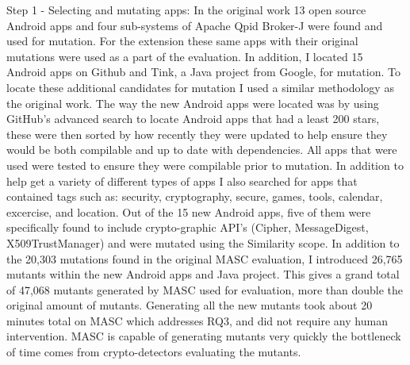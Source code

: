 Step 1 - Selecting and mutating apps: In the original work 13 open source Android apps and four sub-systems of Apache Qpid Broker-J were found and used for mutation. For the extension these same apps with their original mutations were used as a part of the evaluation. In addition, I located 15 Android apps on Github and Tink, a Java project from Google, for mutation. To locate these additional candidates for mutation I used a similar methodology as the original work. The way the new Android apps were located was by using GitHub's advanced search to locate Android apps that had a least 200 stars, these were then sorted by how recently they were updated to help ensure they would be both compilable and up to date with dependencies. All apps that were used were tested to ensure they were compilable prior to mutation. In addition to help get a variety of different types of apps I also searched for apps that contained tags such as: security, cryptography, secure, games, tools, calendar, excercise, and location. Out of the 15 new Android apps, five of them were specifically found to include crypto-graphic API's (Cipher, MessageDigest, X509TrustManager) and were mutated using the Similarity scope. In addition to the 20,303 mutations found in the original MASC evaluation, I introduced 26,765 mutants within the new Android apps and Java project. This gives a grand total of 47,068 mutants generated by MASC used for evaluation, more than double the original amount of mutants. Generating all the new mutants took about 20 minutes total on MASC which addresses RQ3, and did not require any human intervention. MASC is capable of generating mutants very quickly the bottleneck of time comes from crypto-detectors evaluating the mutants.

